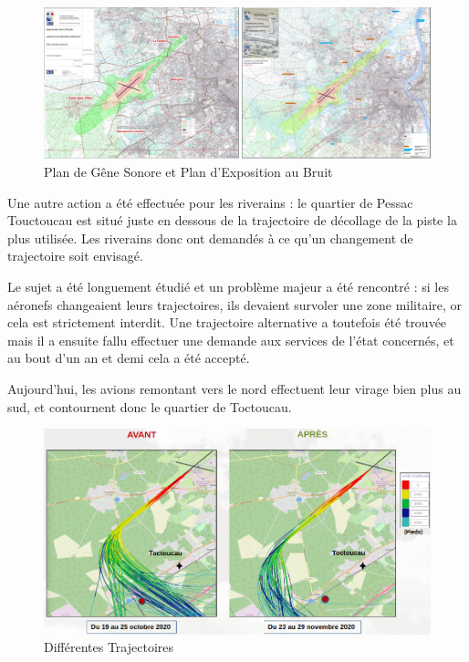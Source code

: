 \begin{figure}[hbt!]
  \centering
  \includegraphics[width=16cm]{Images/pgs_peb.png}\newline
  \caption{Plan de Gêne Sonore et Plan d'Exposition au Bruit}
  \label{fig:pgs_peb}
\end{figure}


Une autre action a été effectuée pour les riverains : le quartier de Pessac Touctoucau est situé juste en dessous de la trajectoire de décollage de la piste la plus utilisée. Les riverains donc ont demandés à ce qu'un changement de trajectoire soit envisagé.

Le sujet a été longuement étudié et un problème majeur a été rencontré : si les aéronefs changeaient leurs trajectoires, ils devaient survoler une zone militaire, or cela est strictement interdit.
Une trajectoire alternative a toutefois été trouvée mais il a ensuite fallu effectuer une demande aux services de l'état concernés, et au bout d'un an et demi cela a été accepté.\newline

Aujourd'hui, les avions remontant vers le nord effectuent leur virage bien plus au sud, et contournent donc le quartier de Toctoucau.\newline

\begin{figure}[hbt!]
  \centering
  \includegraphics[width=13.5cm]{Images/trajectoires_avant_apres.png}\newline
  \caption{Différentes Trajectoires}
  \label{fig:trajectoires}
\end{figure}

